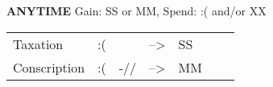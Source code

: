 \begin{flushleft}
  \textbf{ANYTIME} \textcolor{supplemental}{Gain: SS or MM, Spend: :( and/or XX}
\end{flushleft}
\begin{tabular}{lllllll}
Taxation     & :(  &     & --\textgreater{} & SS &  &  \\
Conscription & :( & -// & --\textgreater{} & MM &  &
\end{tabular}
